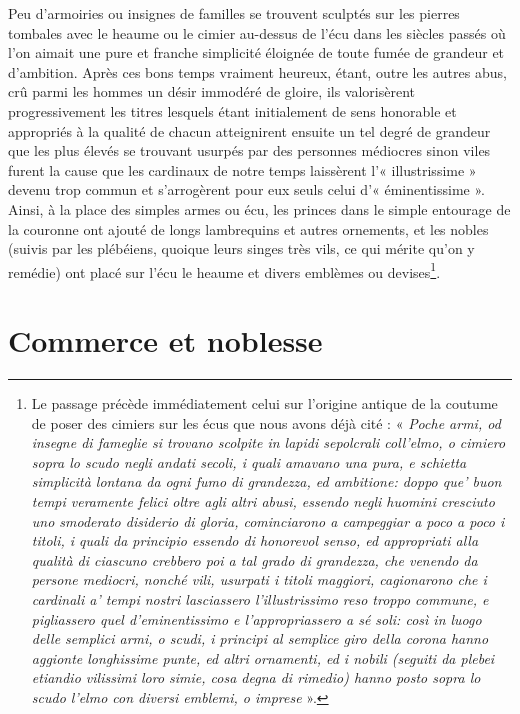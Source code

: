 \documentclass[12pt,twoside,openany]{book}
\renewenvironment{quote}
  {%
    \par\begingroup
    \fontsize{11pt}{14pt}\selectfont
    \list{}{\leftmargin=1.5em\rightmargin=1.5em}%
    \item\relax
  }
  {%
    \endlist
    \endgroup
  }
\newenvironment{PurhBlockQuote}
  {%
    \begin{quote}
  }
  {%
    \end{quote}
  }
\begin{document}
\begin{PurhBlockQuote}
Peu d’armoiries ou insignes de familles se trouvent sculptés sur les pierres tombales avec le heaume ou le cimier au-dessus de l’écu dans les siècles passés où l’on aimait une pure et franche simplicité éloignée de toute fumée de grandeur et d’ambition. Après ces bons temps vraiment heureux, étant, outre les autres abus, crû parmi les hommes un désir immodéré de gloire, ils valorisèrent progressivement les titres lesquels étant initialement de sens honorable et appropriés à la qualité de chacun atteignirent ensuite un tel degré de grandeur que les plus élevés se trouvant usurpés par des personnes médiocres sinon viles furent la cause que les cardinaux de notre temps laissèrent l’« illustrissime » devenu trop commun et s’arrogèrent pour eux seuls celui d’« éminentissime ». Ainsi, à la place des simples armes ou écu, les princes dans le simple entourage de la couronne ont ajouté de longs lambrequins et autres ornements, et les nobles (suivis par les plébéiens, quoique leurs singes très vils, ce qui mérite qu’on y remédie) ont placé sur l’écu le heaume et divers emblèmes ou devises\footnote{Le passage précède immédiatement celui sur l’origine antique de la coutume de poser des cimiers sur les écus que nous avons déjà cité : « \textit{Poche armi, od insegne di fameglie si trovano scolpite in lapidi sepolcrali coll’elmo, o cimiero sopra lo scudo negli andati secoli, i quali amavano una pura, e schietta simplicità lontana da ogni fumo di grandezza, ed ambitione: doppo que’ buon tempi veramente felici oltre agli altri abusi, essendo negli huomini cresciuto uno smoderato disiderio di gloria, cominciarono a campeggiar a poco a poco i titoli, i quali da principio essendo di honorevol senso, ed appropriati alla qualità di ciascuno crebbero poi a tal grado di grandezza, che venendo da persone mediocri, nonché vili, usurpati i titoli maggiori, cagionarono che i cardinali a’ tempi nostri lasciassero l’illustrissimo reso troppo commune, e pigliassero quel d’eminentissimo e l’appropriassero a sé soli: così in luogo delle semplici armi, o scudi, i principi al semplice giro della corona hanno aggionte longhissime punte, ed altri ornamenti, ed i nobili (seguiti da plebei etiandio vilissimi loro simie, cosa degna di rimedio) hanno posto sopra lo scudo l’elmo con diversi emblemi, o imprese }».}.
\end{PurhBlockQuote}

\section{Commerce et noblesse}
\end{document}
